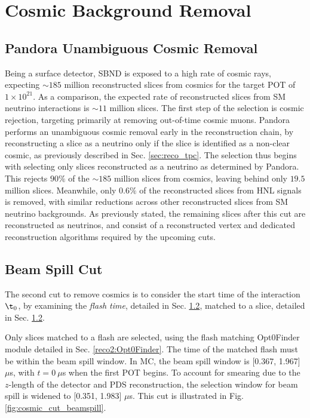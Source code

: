 
\section{Cosmic Background Removal}

\subsection{Pandora Unambiguous Cosmic Removal}

Being a surface detector, SBND is exposed to a high rate of cosmic rays, expecting $\sim 185$ million reconstructed slices from cosmics for the target POT of $1 \times 10^{21}$.
As a comparison, the expected rate of reconstructed slices from SM neutrino interactions is $\sim 11$ million slices.
The first step of the selection is cosmic rejection, targeting primarily at removing out-of-time cosmic muons.
Pandora performs an unambiguous cosmic removal early in the reconstruction chain, by reconstructing a slice as a neutrino only if the slice is identified as a non-clear cosmic, as previously described in Sec. \ref{sec:reco_tpc}. 
The selection thus begins with selecting only slices reconstructed as a neutrino as determined by Pandora.
This rejects $90 \%$ of the $\sim 185$ million slices from cosmics, leaving behind only $19.5$ million slices.
Meanwhile, only $0.6 \%$ of the reconstructed slices from HNL signals is removed, with similar reductions across other reconstructed slices from SM neutrino backgrounds.  
As previously stated, the remaining slices after this cut are reconstructed as neutrinos, and consist of a reconstructed vertex and dedicated reconstruction algorithms required by the upcoming cuts.

\subsection{Beam Spill Cut}

The second cut to remove cosmics is to consider the start time of the interaction $\t_0$, by examining the \textit{flash time}, detailed in Sec. \ref{}, matched to a slice, detailed in Sec. \ref{}.  

Only slices matched to a flash are selected, using the flash matching Opt0Finder module detailed in Sec. \ref{reco2:Opt0Finder}.
The time of the matched flash must be within the beam spill window.
In MC, the beam spill window is [0.367, 1.967] $\mu$s, with $t = 0\ \mu$s when the first POT begins.
To account for smearing due to the $z$-length of the detector and PDS reconstruction, the selection window for beam spill is widened to [0.351, 1.983] $\mu$s.
This cut is illustrated in Fig. \ref{fig:cosmic_cut_beamspill}.

